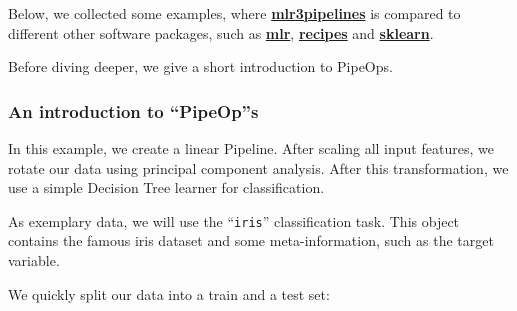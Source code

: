 \documentclass[]{article}
\newenvironment{Shaded}{\begin{snugshade}}{\end{snugshade}}
\newcommand{\CommentTok}[1]{\textcolor[rgb]{0.56,0.35,0.01}{\textit{#1}}}
\newcommand{\DecValTok}[1]{\textcolor[rgb]{0.00,0.00,0.81}{#1}}
\newcommand{\KeywordTok}[1]{\textcolor[rgb]{0.13,0.29,0.53}{\textbf{#1}}}
\newcommand{\NormalTok}[1]{#1}
\newcommand{\OperatorTok}[1]{\textcolor[rgb]{0.81,0.36,0.00}{\textbf{#1}}}
\newcommand{\StringTok}[1]{\textcolor[rgb]{0.31,0.60,0.02}{#1}}
\renewenvironment{Shaded} {\begin{snugshade}\small} {\end{snugshade}}
\begin{document}
Below, we collected some examples, where \textbf{\href{https://cran.r-project.org/package=mlr3pipelines}{mlr3pipelines}} is compared to different other software packages,
such as \textbf{\href{https://cran.r-project.org/package=mlr}{mlr}}, \textbf{\href{https://cran.r-project.org/package=recipes}{recipes}} and \textbf{\href{https://scikit-learn.org/stable/}{sklearn}}.

Before diving deeper, we give a short introduction to PipeOps.

\hypertarget{an-introduction-to-pipeops}{%
\subsubsection{An introduction to ``PipeOp''s}\label{an-introduction-to-pipeops}}

In this example, we create a linear Pipeline.
After scaling all input features, we rotate our data using principal component analysis.
After this transformation, we use a simple Decision Tree learner for classification.

As exemplary data, we will use the ``\texttt{iris}'' classification task.
This object contains the famous iris dataset and some meta-information, such as the target variable.

\begin{Shaded}
\end{Shaded}

We quickly split our data into a train and a test set:

\begin{Shaded}
\end{Shaded}
\end{document}
